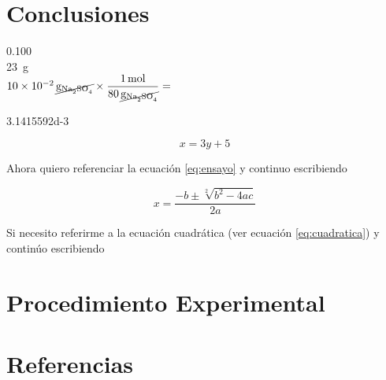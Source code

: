 \documentclass[12pt,letterpaper]{article}
\begin{document}
\section{Conclusiones\label{sec:conclusions}}

\SI{0.100}{\Molar} \\



\SI{23}{\gram}\\

$\SI{10d-2}{\cancel\gram\of{\ce{Na2SO4}}} \times \dfrac{\SI{1}{\mole}}{\SI{80}{\cancel\gram\of{\ce{Na2SO4}}}} = $

\num{3.1415592d-3}

\begin{equation}
\label{eq:ensayo}
x=3y+5
\end{equation}

Ahora quiero referenciar la ecuación \ref{eq:ensayo} y continuo escribiendo


\begin{equation}
\label{eq:cuadratica}
x=\frac { -b\pm \sqrt [ 2 ]{ { b }^{ 2 }-4ac }  }{ 2a } 
\end{equation}

Si necesito referirme a la ecuación cuadrática (ver ecuación \ref{eq:cuadratica}) y continúo escribiendo


\section{Procedimiento Experimental\label{sec:procedure}}

\section{Referencias\label{sec:references}}


\printbibliography[heading=none]
		
\end{document}
